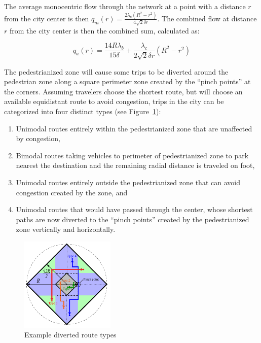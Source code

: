 \documentclass{elsarticle}\usepackage[]{graphicx}\usepackage[]{color}
\begin{document}
The average monocentric flow through the network at a point with a distance $r$ from the city center is then $q_m(r) = \frac{2\lambda_c \left(R^2 - r^2\right)}{4\sqrt{2}\delta r}$. The combined flow at distance $r$ from the city center is then the combined sum, calculated as:

\begin{equation}
    q_a(r) = \frac{14R\lambda_b}{15\delta} + \frac{\lambda_c}{2\sqrt{2}\delta r} \left(R^2 - r^2 \right)
    \label{eq:flowacross}
\end{equation}

\noindent The pedestrianized zone will cause some trips to be diverted around the pedestrian zone along a square perimeter zone created by the ``pinch points'' at the corners. Assuming travelers choose the shortest route, but will choose an available equidistant route to avoid congestion, trips in the city can be categorized into four distinct types (see Figure~\ref{fig:diverted}):

\begin{enumerate}
	\item Unimodal routes entirely within the pedestrianized zone that are unaffected by congestion, 
	\item Bimodal routes taking vehicles to perimeter of pedestrianized zone to park nearest the destination and the remaining radial distance is traveled on foot,
	\item Unimodal routes entirely outside the pedestrianized zone that can avoid congestion created by the zone, and
	\item Unimodal routes that would have passed through the center, whose shortest paths are now diverted to the ``pinch points'' created by the pedestrianized zone vertically and horizontally.
\end{enumerate}

\begin{figure}[H]
     \centering
     \includegraphics[width=0.4\textwidth]{diagram_diverted_routes}
     \caption{Example diverted route types}
     \label{fig:diverted}
\end{figure}
\end{document}
